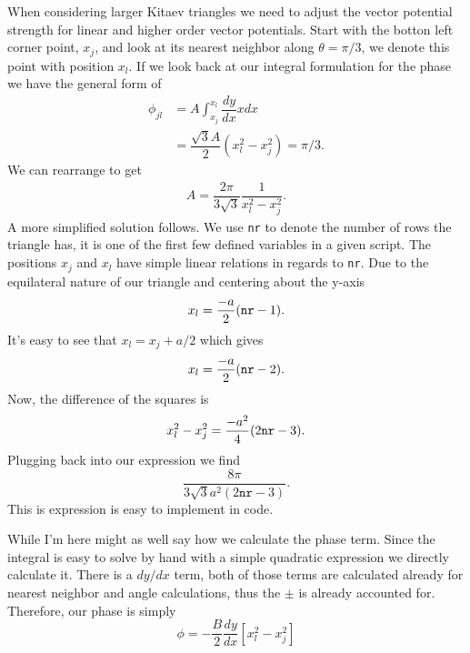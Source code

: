 When considering larger Kitaev triangles we need to adjust the vector potential strength for linear and higher order vector potentials.
Start with the botton left corner point, $x_j$, and look at its nearest neighbor along $\theta=\pi/3$, we denote this point with position $x_l$.
If we look back at our integral formulation for the phase we have the general form of
\begin{align}
  \phi_{jl} &= A \int_{x_j}^{x_l} \dfrac{dy}{dx} x dx \nonumber \\
  &= \dfrac{\sqrt{3} A}{2} (x_l^2 - x_j^2) = \pi/3. \nonumber
\end{align}
We can rearrange to get
\begin{align}
  A = \dfrac{2 \pi}{3 \sqrt{3}} \dfrac{1}{x_l^2 - x_j^2}.
\end{align}
A more simplified solution follows.
We use \verb|nr| to denote the number of rows the triangle has, it is one of the first few defined variables in a given script.
The positions $x_j$ and $x_l$ have simple linear relations in regards to \verb|nr|.
Due to the equilateral nature of our triangle and centering about the y-axis
\begin{equation}
  x_l = \dfrac{-a}{2} (\verb|nr| - 1).
\end{equation}
It's easy to see that $x_l = x_j + a/2$ which gives
\begin{equation}
  x_l = \dfrac{-a}{2} (\verb|nr| - 2).
\end{equation}
Now, the difference of the squares is
\begin{equation}
  x_l^2 - x_j^2 = \dfrac{-a^2}{4} (2 \verb|nr| - 3).
\end{equation}
Plugging back into our expression we find
\begin{equation}
  \dfrac{8 \pi}{3 \sqrt{3} a^2 (2 \texttt{nr}- 3)}.
\end{equation}
This is expression is easy to implement in code.

While I'm here might as well say how we calculate the phase term.
Since the integral is easy to solve by hand with a simple quadratic expression we directly calculate it.
There is a $dy/dx$ term, both of those terms are calculated already for nearest neighbor and angle calculations, thus the $\pm$ is already accounted for.
Therefore, our phase is simply
\begin{equation}
  \phi = -\dfrac{B}{2} \dfrac{dy}{dx} [x_l^2 - x_j^2]
\end{equation}

